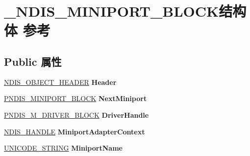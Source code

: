 \hypertarget{struct___n_d_i_s___m_i_n_i_p_o_r_t___b_l_o_c_k}{}\section{\+\_\+\+N\+D\+I\+S\+\_\+\+M\+I\+N\+I\+P\+O\+R\+T\+\_\+\+B\+L\+O\+C\+K结构体 参考}
\label{struct___n_d_i_s___m_i_n_i_p_o_r_t___b_l_o_c_k}
\subsection*{Public 属性}
\begin{DoxyCompactItemize}
\item 
\mbox{\label{struct___n_d_i_s___m_i_n_i_p_o_r_t___b_l_o_c_k_a07193d08021d2273b10e058153972207}} 
\hyperlink{struct___n_d_i_s___o_b_j_e_c_t___h_e_a_d_e_r}{N\+D\+I\+S\+\_\+\+O\+B\+J\+E\+C\+T\+\_\+\+H\+E\+A\+D\+ER} {\bfseries Header}
\item 
\mbox{\label{struct___n_d_i_s___m_i_n_i_p_o_r_t___b_l_o_c_k_aec64ca69f62b879c4609c64a4d6fe457}} 
\hyperlink{struct___n_d_i_s___m_i_n_i_p_o_r_t___b_l_o_c_k}{P\+N\+D\+I\+S\+\_\+\+M\+I\+N\+I\+P\+O\+R\+T\+\_\+\+B\+L\+O\+CK} {\bfseries Next\+Miniport}
\item 
\mbox{\label{struct___n_d_i_s___m_i_n_i_p_o_r_t___b_l_o_c_k_af111a0815ff5a82ed5eb9351fe0571f0}} 
\hyperlink{struct___n_d_i_s___m___d_r_i_v_e_r___b_l_o_c_k}{P\+N\+D\+I\+S\+\_\+\+M\+\_\+\+D\+R\+I\+V\+E\+R\+\_\+\+B\+L\+O\+CK} {\bfseries Driver\+Handle}
\item 
\mbox{\label{struct___n_d_i_s___m_i_n_i_p_o_r_t___b_l_o_c_k_a7e6d6590236e68c5206b7bc877cb2b49}} 
\hyperlink{interfacevoid}{N\+D\+I\+S\+\_\+\+H\+A\+N\+D\+LE} {\bfseries Miniport\+Adapter\+Context}
\item 
\mbox{\label{struct___n_d_i_s___m_i_n_i_p_o_r_t___b_l_o_c_k_af0031669dab58412b2d90bca633c0aa4}} 
\hyperlink{struct___u_n_i_c_o_d_e___s_t_r_i_n_g}{U\+N\+I\+C\+O\+D\+E\+\_\+\+S\+T\+R\+I\+NG} {\bfseries Miniport\+Name}

\end{DoxyCompactItemize}
